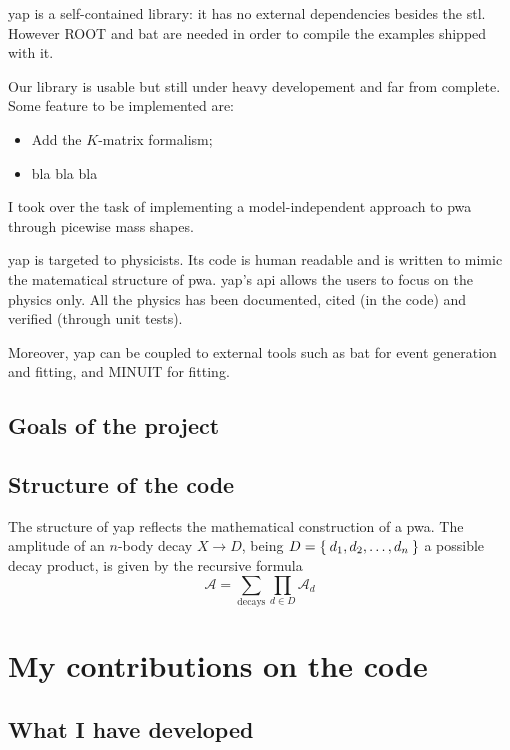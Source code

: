 \documentclass[
	fontsize=10pt,
	open=right,
	twoside,
    english,
    draft,
]{scrbook}
\newcommand{\A}{\ensuremath{\mathcal{A}}}
\newcommand{\ROOT}{{\footnotesize{ROOT}}}
\newcommand{\MINUIT}{{\footnotesize{MINUIT}}}
\begin{document}
    
    \Ac{yap} is a self-contained library: it has no external dependencies besides the \ac{stl}.
    However \ROOT{} and \ac{bat} are needed in order to compile the examples shipped with it.
    
    Our library is usable but still under heavy developement and far from complete.
    Some feature to be implemented are:
    \begin{itemize}
        \item Add the $K$-matrix formalism;
        \item bla bla bla
    \end{itemize}
    I took over the task of implementing a model-independent approach to \ac{pwa} through picewise mass shapes.



    \ac{yap} is targeted to physicists.
    Its code is human readable and is written to mimic the matematical structure of \ac{pwa}.
    \ac{yap}'s \ac{api} allows the users to focus on the physics only.
    All the physics has been documented, cited (in the code) and verified (through unit tests).

    Moreover, \ac{yap} can be coupled to external tools such as \ac{bat} for event generation and fitting, and \MINUIT{} for fitting.

    \section{Goals of the project}

    \section{Structure of the code}
    The structure of \ac{yap} reflects the mathematical construction of a \ac{pwa}.
    The amplitude of an $n$-body decay $X\to D$, being $D = \Set{d_1, d_2,\dots,d_n}$ a possible decay product, is given by the recursive formula
    \begin{equation}
        \A = \sum_{\text{decays}} \prod_{d \in D} \A_d
    \end{equation}


\chapter{My contributions on the code}
    \section{What I have developed}
\end{document}
